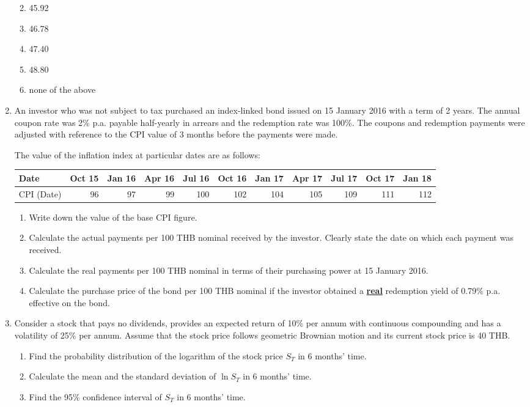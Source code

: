\documentclass[
]{article}
\theoremstyle{definition}
\theoremstyle{definition}
\theoremstyle{definition}
\theoremstyle{definition}
\theoremstyle{remark}
\begin{document}
\begin{enumerate}
  \begin{enumerate}
  \def\labelenumii{\Alph{enumii}.}
  \item
    45.92
  \item
    46.78
  \item
    47.40
  \item
    48.80
  \item
    none of the above
  \end{enumerate}
\item
  An investor who was not subject to tax purchased an index-linked
  bond issued on 15 January 2016 with a term of 2 years. The annual
  coupon rate was 2\% p.a. payable half-yearly in arrears and the
  redemption rate was 100\%. The coupons and redemption payments were
  adjusted with reference to the CPI value of 3 months before the
  payments were made.

  The value of the inflation index at particular dates are as follows:

  \begin{longtable}[]{@{}lrrrrrrrrrr@{}}
  \toprule
  Date & Oct 15 & Jan 16 & Apr 16 & Jul 16 & Oct 16 & Jan 17 & Apr 17 & Jul 17 & Oct 17 & Jan 18 \\
  \midrule
  \endhead
  CPI (Date) & 96 & 97 & 99 & 100 & 102 & 104 & 105 & 109 & 111 & 112 \\
  \bottomrule
  \end{longtable}

  \begin{enumerate}
  \def\labelenumii{\arabic{enumii}.}
  \item
    Write down the value of the base CPI figure.
  \item
    Calculate the actual payments per 100 THB nominal received by
    the investor. Clearly state the date on which each payment was
    received.
  \item
    Calculate the real payments per 100 THB nominal in terms of
    their purchasing power at 15 January 2016.
  \item
    Calculate the purchase price of the bond per 100 THB nominal if
    the investor obtained a \underline{\textbf{real}} redemption yield of
    0.79\% p.a. effective on the bond.
  \end{enumerate}
\item
  Consider a stock that pays no dividends, provides an expected return
  of 10\% per annum with continuous compounding and has a volatility of
  25\% per annum. Assume that the stock price follows geometric
  Brownian motion and its current stock price is 40 THB.

  \begin{enumerate}
  \def\labelenumii{\arabic{enumii}.}
  \item
    Find the probability distribution of the logarithm of the stock
    price \(S_T\) in 6 months' time.
  \item
    Calculate the mean and the standard deviation of \(\ln S_T\) in 6
    months' time.
  \item
    Find the 95\% confidence interval of \(S_T\) in 6 months' time.
  \end{enumerate}
\end{enumerate}
\end{document}
